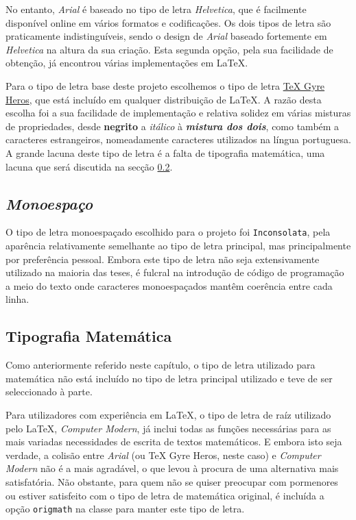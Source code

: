 \documentclass{../ist-thesis}
\begin{document}
No entanto, \textit{Arial} é baseado no tipo de letra \textit{Helvetica}, que é facilmente disponível online em vários formatos e codificações. Os dois tipos de letra são praticamente indistinguíveis, sendo o design de \textit{Arial} baseado fortemente em \textit{Helvetica} na altura da sua criação. Esta segunda opção, pela sua facilidade de obtenção, já encontrou várias implementações em \LaTeX{}.

Para o tipo de letra base deste projeto escolhemos o tipo de letra \href{https://ctan.org/pkg/tex-gyre-heros}{\TeX{} Gyre Heros}, que está incluído em qualquer distribuição de \LaTeX{}. A razão desta escolha foi a sua facilidade de implementação e relativa solidez em várias misturas de propriedades, desde \textbf{negrito} a \textit{itálico} à {\bfseries\itshape mistura dos dois}, como também a caracteres estrangeiros, nomeadamente caracteres utilizados na língua portuguesa. A grande lacuna deste tipo de letra é a falta de tipografia matemática, uma lacuna que será discutida na secção \ref{sec:mathfont}.

\subsection{\textit{Monoespaço}}

O tipo de letra monoespaçado escolhido para o projeto foi \texttt{Inconsolata}, pela aparência relativamente semelhante ao tipo de letra principal, mas principalmente por preferência pessoal. Embora este tipo de letra não seja extensivamente utilizado na maioria das teses, é fulcral na introdução de código de programação a meio do texto onde caracteres monoespaçados mantêm coerência entre cada linha.

\subsection{Tipografia Matemática}
\label{sec:mathfont}

Como anteriormente referido neste capítulo, o tipo de letra utilizado para matemática não está incluído no tipo de letra principal utilizado e teve de ser seleccionado à parte.

Para utilizadores com experiência em \LaTeX{}, o tipo de letra de raíz utilizado pelo \LaTeX{}, \textit{Computer Modern}, já inclui todas as funções necessárias para as mais variadas necessidades de escrita de textos matemáticos. E embora isto seja verdade, a colisão entre \textit{Arial} (ou \TeX{} Gyre Heros, neste caso) e \textit{Computer Modern} não é a mais agradável, o que levou à procura de uma alternativa mais satisfatória. Não obstante, para quem não se quiser preocupar com pormenores ou estiver satisfeito com o tipo de letra de matemática original, é incluída a opção \texttt{origmath} na classe para manter este tipo de letra.
\end{document}
